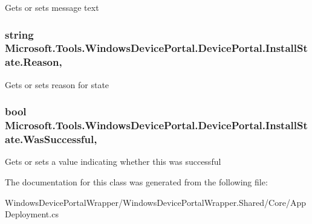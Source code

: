 Gets or sets message text 

\subsubsection[{\texorpdfstring{Reason}{Reason}}]{\setlength{\rightskip}{0pt plus 5cm}string Microsoft.\+Tools.\+Windows\+Device\+Portal.\+Device\+Portal.\+Install\+State.\+Reason\hspace{0.3cm}{\ttfamily [get]}, {\ttfamily [set]}}\hypertarget{class_microsoft_1_1_tools_1_1_windows_device_portal_1_1_device_portal_1_1_install_state_ab782a8f83700ec79820482a7b8f3f910}{}\label{class_microsoft_1_1_tools_1_1_windows_device_portal_1_1_device_portal_1_1_install_state_ab782a8f83700ec79820482a7b8f3f910}


Gets or sets reason for state 

\subsubsection[{\texorpdfstring{Was\+Successful}{WasSuccessful}}]{\setlength{\rightskip}{0pt plus 5cm}bool Microsoft.\+Tools.\+Windows\+Device\+Portal.\+Device\+Portal.\+Install\+State.\+Was\+Successful\hspace{0.3cm}{\ttfamily [get]}, {\ttfamily [set]}}\hypertarget{class_microsoft_1_1_tools_1_1_windows_device_portal_1_1_device_portal_1_1_install_state_a80a5eebd7063f999e188aeda1ef35e81}{}\label{class_microsoft_1_1_tools_1_1_windows_device_portal_1_1_device_portal_1_1_install_state_a80a5eebd7063f999e188aeda1ef35e81}


Gets or sets a value indicating whether this was successful 



The documentation for this class was generated from the following file\+:\begin{DoxyCompactItemize}
\item 
Windows\+Device\+Portal\+Wrapper/\+Windows\+Device\+Portal\+Wrapper.\+Shared/\+Core/App\+Deployment.\+cs\end{DoxyCompactItemize}
